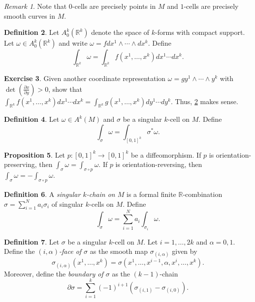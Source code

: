\documentclass[10pt,letterpaper,cm]{nupset}
\theoremstyle{definition}
\newtheorem{definition}{Definition}[subsection]
\theoremstyle{theorem}
\newtheorem{prop}[definition]{Proposition}
\newtheorem{exercise}[definition]{Exercise}
\theoremstyle{remark}
\newtheorem{remark}[definition]{Remark}
\newcommand{\R}{\mathbb R}
\newcommand{\1}{\mathbf{1}}
\newcommand{\0}{\vec 0}
\begin{document}
\begin{remark}
Note that $0$-cells are precisely points in $M$ and $1$-cells are precisely smooth curves in $M$.
\end{remark}

\begin{definition}\label{forms}
Let $A_0^k\left(\R^k\right)$ denote the space of $k$-forms with compact support. Let $\omega \in A_0^k(\R^k)$ and write $\omega = fdx^1\wedge \cdots \wedge dx^k$. Define $$ \int_{\R^k}\omega = \int_{\R^k} f(x^1, \ldots, x^k)dx^1\cdots dx^k  .$$
\end{definition}

\begin{exercise}
Given another coordinate representation $\omega = gy^1 \wedge \cdots \wedge y^k$ with $\det\left(\frac{\partial{x}}{\partial{y}}\right) >0$, show that $\int_{\R^k} f(x^1, \ldots, x^k)dx^1\cdots dx^k  = \int_{\R^k} g(x^1, \ldots, x^k)dy^1\cdots dy^k.$ Thus, \cref{forms} makes sense.
\end{exercise}

\begin{definition}
Let $\omega \in A^k(M)$ and $\sigma$ be a singular $k$-cell on $M$. Define $$ \int_{\sigma} \omega = \int_{[0,1]^k}\sigma^{\ast}\omega  .$$
\end{definition}

\begin{prop}\label{preserve}
Let $p: [0,1]^k \to [0,1]^k$ be a diffeomorphism. If $p$ is orientation-preserving, then $\int_{\sigma} \omega = \int_{\sigma \circ p} \omega$. If $p$ is orientation-reversing, then $\int_{\sigma} \omega = -\int_{\sigma \circ p} \omega.$
\end{prop}

\begin{definition}
A \textit{singular $k$-chain on $M$} is a formal finite  $\R$-combination $\sigma = \sum_{i=1}^Na_i\sigma_i$ of singular $k$-cells on $M$. Define $$ \int_{\sigma} \omega= \sum_{i=1}^N a_i\int_{\sigma_i}\omega .$$
\end{definition}

\begin{definition}
Let $\sigma$ be a singular $k$-cell on $M$. Let $i=1, \ldots, 2k$ and $\alpha =0,1$. Define the \textit{$(i, \alpha)$-face of $\sigma$} as the smooth map $\sigma_{(i, \alpha)}$ given by $$\sigma_{(i, \alpha)}(x^1, \ldots, x^k) = \sigma(x^1,\ldots, x^{i-1}, \alpha, x^{i}, \ldots, x^k).$$ Moreover, define the \textit{boundary of $\sigma$} as the $(k-1)$-chain $$  \partial{\sigma} = \sum_{i=1}^k({-}1)^{i+1}(\sigma_{(i,1)}-\sigma_{(i,0)}) .$$
\end{definition}
\end{document}
